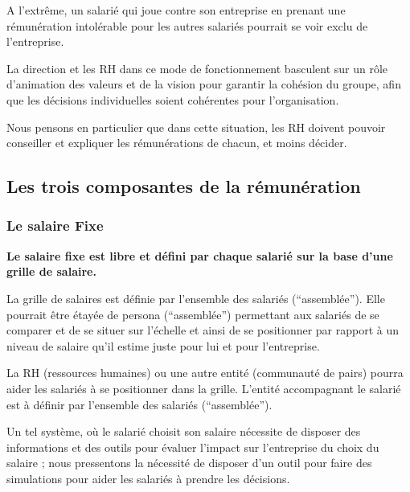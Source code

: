 \documentclass[12pt]{article}
\newcommand{\regle}[1]{%
  \textbf{#1}
}
\begin{document}
 A l'extrême, un salarié qui joue contre son entreprise en prenant une rémunération intolérable pour les autres salariés pourrait se voir exclu de l’entreprise. 

 La direction et les RH dans ce mode de fonctionnement basculent sur un rôle d’animation des valeurs et de la vision pour garantir la cohésion du groupe, afin que les décisions individuelles soient cohérentes pour l’organisation. 
 
 Nous pensons en particulier que dans cette situation, les RH doivent pouvoir conseiller et expliquer les rémunérations de chacun, et moins décider.

\subsection{Les trois composantes de la rémunération}
\subsubsection{Le salaire Fixe}

 \regle{Le salaire fixe est libre et défini par chaque salarié sur la base d’une grille de salaire. }

 La grille de salaires est définie par l’ensemble des salariés (“assemblée”). Elle pourrait être étayée de persona  (“assemblée”) permettant aux salariés de se comparer et de se situer sur l’échelle et ainsi de se positionner par rapport à un niveau de salaire qu’il estime juste pour lui et pour l’entreprise. 

 La RH (ressources humaines) ou une autre entité (communauté de pairs) pourra aider les salariés à se positionner dans la grille. L'entité accompagnant le salarié est à définir par l'ensemble des salariés (“assemblée”).
 
 Un tel système, où le salarié choisit son salaire nécessite de disposer des informations et des outils pour évaluer l’impact sur l’entreprise du choix du salaire ; nous pressentons la nécessité de disposer d’un outil pour faire des simulations pour aider les salariés à prendre les décisions.
 
\end{document}
